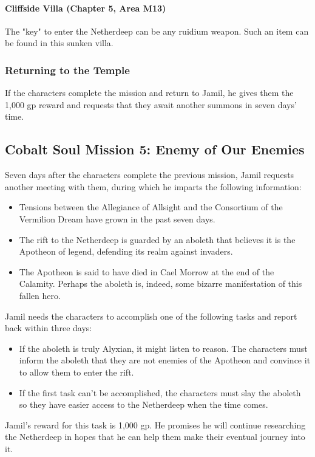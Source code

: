 \documentclass[10pt,a4,twoside,twocolumn,openany,nodeprecatedcode]{dndbook}
\begin{document}
\paragraph{Cliffside Villa (Chapter 5, Area M13)}
The "key" to enter the Netherdeep can be any ruidium weapon. Such an item can be found in this sunken villa.
\subsubsection{Returning to the Temple}
If the characters complete the mission and return to Jamil, he gives them the 1,000 gp reward and requests that they await another summons in seven days' time.
\subsection{Cobalt Soul Mission 5: Enemy of Our Enemies}
Seven days after the characters complete the previous mission, Jamil requests another meeting with them, during which he imparts the following information:
\begin{itemize}

\item Tensions between the Allegiance of Allsight and the Consortium of the Vermilion Dream have grown in the past seven days.
\item The rift to the Netherdeep is guarded by an aboleth that believes it is the Apotheon of legend, defending its realm against invaders.
\item The Apotheon is said to have died in Cael Morrow at the end of the Calamity. Perhaps the aboleth is, indeed, some bizarre manifestation of this fallen hero.
\end{itemize}


Jamil needs the characters to accomplish one of the following tasks and report back within three days:
\begin{itemize}

\item If the aboleth is truly Alyxian, it might listen to reason. The characters must inform the aboleth that they are not enemies of the Apotheon and convince it to allow them to enter the rift.
\item If the first task can't be accomplished, the characters must slay the aboleth so they have easier access to the Netherdeep when the time comes.
\end{itemize}


Jamil's reward for this task is 1,000 gp. He promises he will continue researching the Netherdeep in hopes that he can help them make their eventual journey into it.
\end{document}
